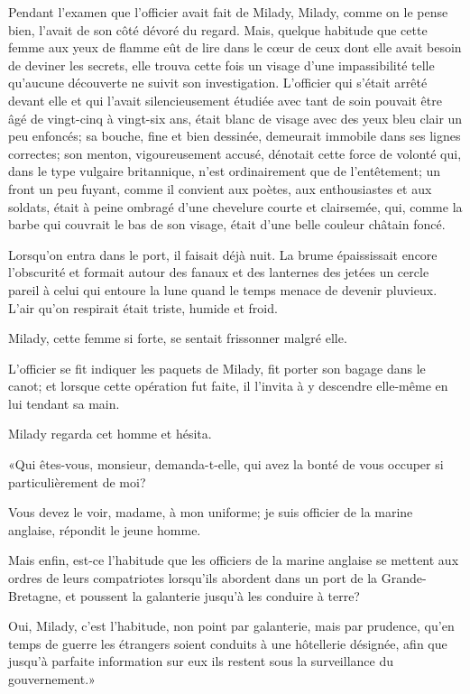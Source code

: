 Pendant l'examen que l'officier avait fait de Milady, Milady, comme on le pense bien, l'avait de son côté dévoré du regard. Mais, quelque habitude que cette femme aux yeux de flamme eût de lire dans le cœur de ceux dont elle avait besoin de deviner les secrets, elle trouva cette fois un visage d'une impassibilité telle qu'aucune découverte ne suivit son investigation. L'officier qui s'était arrêté devant elle et qui l'avait silencieusement étudiée avec tant de soin pouvait être âgé de vingt-cinq à vingt-six ans, était blanc de visage avec des yeux bleu clair un peu enfoncés; sa bouche, fine et bien dessinée, demeurait immobile dans ses lignes correctes; son menton, vigoureusement accusé, dénotait cette force de volonté qui, dans le type vulgaire britannique, n'est ordinairement que de l'entêtement; un front un peu fuyant, comme il convient aux poètes, aux enthousiastes et aux soldats, était à peine ombragé d'une chevelure courte et clairsemée, qui, comme la barbe qui couvrait le bas de son visage, était d'une belle couleur châtain foncé. 

Lorsqu'on entra dans le port, il faisait déjà nuit. La brume épaississait encore l'obscurité et formait autour des fanaux et des lanternes des jetées un cercle pareil à celui qui entoure la lune quand le temps menace de devenir pluvieux. L'air qu'on respirait était triste, humide et froid. 

Milady, cette femme si forte, se sentait frissonner malgré elle. 

L'officier se fit indiquer les paquets de Milady, fit porter son bagage dans le canot; et lorsque cette opération fut faite, il l'invita à y descendre elle-même en lui tendant sa main. 

Milady regarda cet homme et hésita. 

«Qui êtes-vous, monsieur, demanda-t-elle, qui avez la bonté de vous occuper si particulièrement de moi? 

\speak  Vous devez le voir, madame, à mon uniforme; je suis officier de la marine anglaise, répondit le jeune homme. 

\speak  Mais enfin, est-ce l'habitude que les officiers de la marine anglaise se mettent aux ordres de leurs compatriotes lorsqu'ils abordent dans un port de la Grande-Bretagne, et poussent la galanterie jusqu'à les conduire à terre? 

\speak  Oui, Milady, c'est l'habitude, non point par galanterie, mais par prudence, qu'en temps de guerre les étrangers soient conduits à une hôtellerie désignée, afin que jusqu'à parfaite information sur eux ils restent sous la surveillance du gouvernement.» 

